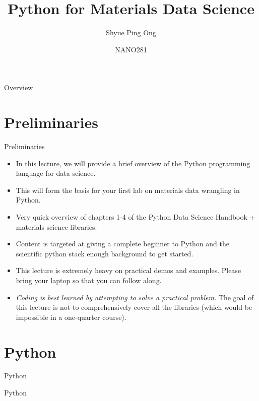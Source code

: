 \documentclass[aspectratio=169]{beamer}
\title[Python for Materials Data Science]{Python for Materials Data Science}
\author{Shyue Ping Ong}
\institute[UCSD]{University of California, San Diego\\
\medskip
}
\date{NANO281} %
\begin{document}
\begin{frame}
    \titlepage %
\end{frame}


\begin{frame}{Overview}
    \tableofcontents
\end{frame}


\section{Preliminaries}

\begin{frame}{Preliminaries}
    \begin{itemize}
        \item In this lecture, we will provide a brief overview of the Python programming language for data science.
        \item This will form the basis for your first lab on materials data wrangling in Python.
        \item Very quick overview of chapters 1-4 of the Python Data Science Handbook\cite{vanderplasPythonDataScience2016} + materials science libraries.
        \item Content is targeted at giving a complete beginner to Python and the scientific python stack enough background to get started.
        \item This lecture is extremely heavy on practical demos and examples. Please bring your laptop so that you can follow along.
        \item \textit{Coding is best learned by attempting to solve a practical problem.} The goal of this lecture is not to comprehensively cover all the libraries (which would be impossible in a one-quarter course).
    \end{itemize}
\end{frame}


\section{Python}

\begin{frame}{Python}
    \Huge{\centerline{Python}}
\end{frame} 
\end{document}
